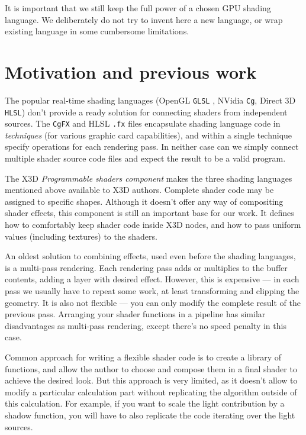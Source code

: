 \documentclass{egpubl}
\begin{document}
It is important that we still keep
the full power of a chosen GPU shading language.
We deliberately do not try to invent here a new language, or wrap existing
language in some cumbersome limitations.

\section{Motivation and previous work}

The popular real-time shading languages (OpenGL \texttt{GLSL} \cite{glsl:book}, NVidia \texttt{Cg}, Direct 3D \texttt{HLSL})
don't provide a ready solution for connecting shaders from independent sources.
The \texttt{CgFX} and HLSL \texttt{.fx} files encapsulate shading language code
in \emph{techniques} (for various graphic card capabilities),
and within a single technique specify operations for each rendering pass.
In neither case can we simply connect multiple shader source code files
and expect the result to be a valid program.

The X3D \textit{Programmable shaders component} \cite{x3d:shaders}
makes the three shading languages mentioned above available to X3D authors.
Complete shader code may be assigned to specific shapes.
Although it doesn't offer any way of compositing shader effects,
this component is still an important base for our work. It defines
how to comfortably keep shader code inside X3D nodes, and how to pass uniform
values (including textures) to the shaders.

An oldest solution to combining effects, used even before the shading languages,
is a multi-pass rendering. Each rendering pass adds or multiplies
to the buffer contents, adding a layer with desired effect.
However, this is expensive --- in each pass we usually have to repeat
some work, at least transforming and clipping the geometry.
It is also not flexible --- you can only modify
the complete result of the previous pass.
Arranging your shader functions in a pipeline has similar disadvantages
as multi-pass rendering, except there's no speed penalty in this case.

Common approach for writing a flexible shader code is to create
a library of functions, and allow the author to choose and compose them
in a final shader to achieve the desired look. But this approach is very limited,
as it doesn't allow to modify a particular calculation part without
replicating the algorithm outside of this calculation.
For example, if you want to scale the light contribution by a shadow function,
you will have to also replicate the code iterating over the light sources.
\end{document}
